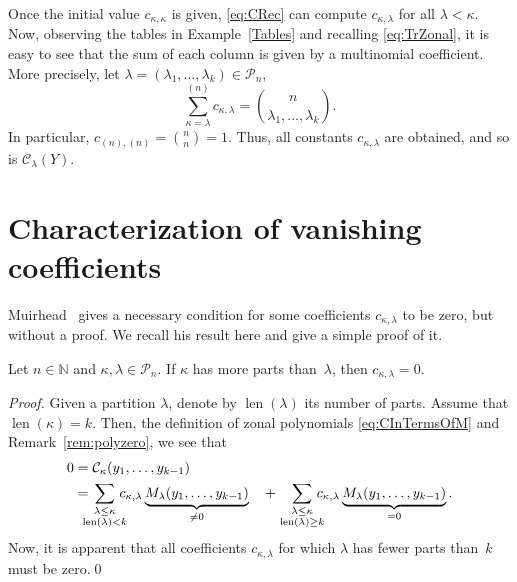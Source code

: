 \documentclass[smallextended]{svjour3}
\begin{document}
Once the initial value $c_{\kappa,\kappa}$ is given,
\eqref{eq:CRec} can compute $c_{\kappa,\lambda}$ for all $\lambda<\kappa$.
Now, observing the tables in Example~\ref{Tables} and recalling \eqref{eq:TrZonal},
it is easy to see that the sum of each column is given by a multinomial
coefficient. More precisely, let
$\lambda=(\lambda_1,\ldots,\lambda_k)\in\mathcal{P}_{n}$,
\begin{equation}
  \sum_{\kappa=\lambda}^{(n)}c_{\kappa,\lambda} =
  \binom{n}{\lambda_1,\ldots,\lambda_k}.\label{eq:CInitial}
\end{equation}
In particular, $c_{(n),(n)}=\binom{n}{n}=1$.
Thus, all constants $c_{\kappa,\lambda}$ are obtained, and so is $\mathcal{C}_{\lambda}(Y)$. 


\section{Characterization of vanishing coefficients}\label{sec:zeros}

Muirhead~\cite[Lem.~7.2.3]{Muirhead} gives a necessary condition for some
coefficients $c_{\kappa,\lambda}$ to be zero, but without a proof. We recall his
result here and give a simple proof of it.
\begin{lemma}\label{lem:zero1}
  Let $n\in\mathbb{N}$ and $\kappa,\lambda\in\mathcal{P}_n$. If $\kappa$
  has more parts than~$\lambda$, then $c_{\kappa,\lambda}=0$.
\end{lemma}
\begin{proof}
  Given a partition $\lambda$, denote by $\operatorname{len}(\lambda)$ its
  number of parts. Assume that $\operatorname{len}(\kappa)=k$. Then, the
  definition of zonal polynomials \eqref{eq:CInTermsOfM} and
  Remark~\ref{rem:polyzero}, we see that
\begin{align*}
 0 &= \mathcal{C}_{\kappa}(y_1,\dots,y_{k-1})\\
    &= 
  \!\!\!\!\!\sum_{\textstyle\genfrac{}{}{0pt}{}{\lambda\leq\kappa}{\operatorname{len}(\lambda)<k}}\!\!\!\!\!
      c_{\kappa,\lambda} \underbrace{M_{\lambda}(y_1,\dots,y_{k-1})}_{\neq0} \quad +
   \sum_{\textstyle\genfrac{}{}{0pt}{}{\lambda\leq\kappa}{\operatorname{len}(\lambda)\geq k}}\!\!\!\!\!
    c_{\kappa,\lambda} \underbrace{M_{\lambda}(y_1,\dots,y_{k-1})}_{=0}.
\end{align*}
  Now, it is apparent that all coefficients $c_{\kappa,\lambda}$
  for which $\lambda$ has fewer parts than~$k$ must be zero.\qed
\end{proof}
\end{document}
